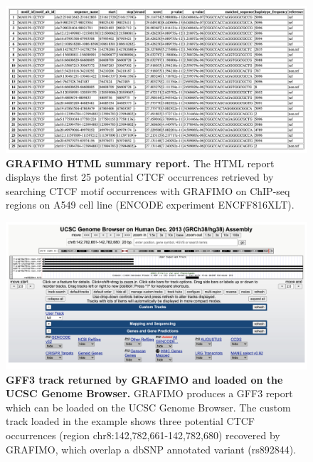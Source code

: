 \documentclass[a4paper, titlepage, openright]{book}
\newcommand{\grafimo}{GRAFIMO\xspace}
\begin{document}
\begin{figure}
    \centering
    \includegraphics[width=\textwidth]{figures/grafimo-html.png}
    \caption[\grafimo HTML summary report]{\textbf{\grafimo HTML summary report.} The HTML report displays the first 25 potential CTCF occurrences retrieved by searching CTCF motif occurrences with \grafimo on ChIP-seq regions on A549 cell line (ENCODE experiment ENCFF816XLT).}
    \label{fig:grafimo-html}
\end{figure}

\begin{figure}
    \centering
    \includegraphics[width=\textwidth]{figures/grafimo-genome-browser.png}
    \caption[GFF3 track returned by \grafimo and loaded on the UCSC Genome Browser]{\textbf{GFF3 track returned by GRAFIMO and loaded on the UCSC Genome Browser.} \grafimo produces a GFF3 report which can be loaded on the UCSC Genome Browser. The custom track loaded in the example shows three potential CTCF occurrences (region chr8:142,782,661-142,782,680) recovered by \grafimo, which overlap a dbSNP annotated variant (rs892844).}
    \label{fig:grafimo-genome-browser}
\end{figure}
\end{document}
